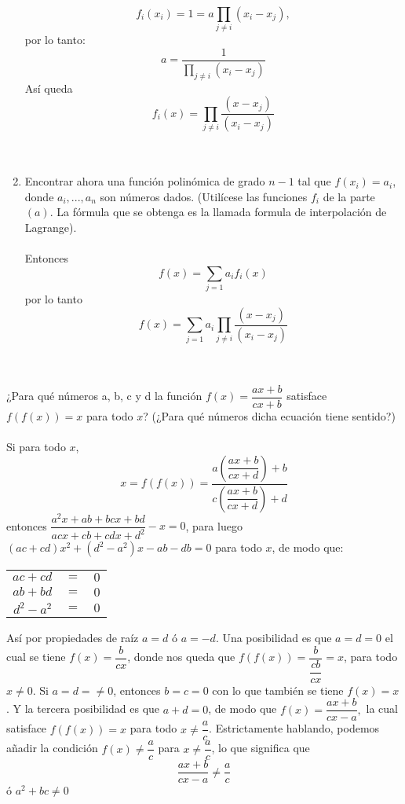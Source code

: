 \begin{ej}
\begin{enumerate}[\bfseries a)]
\[
f_i(x_i)=1=a\prod_{j \neq i} (x_i-x_j), 
\]
por lo tanto:
\[
a= \dfrac{1}{\displaystyle\prod_{j \neq i} (x_i-x_j)} 
\]  
Así queda
\[
f_i(x)= \prod_{j \neq i} \dfrac{(x-x_j)}{(x_i-x_j)}  
\]\\\\
\item Encontrar ahora una función polinómica de grado $n-1$ tal que $f(x_i)=a_i$, donde $a_i,...,a_n$ son números dados. (Utilícese las funciones $f_i$ de la parte $(a)$. La fórmula que se obtenga es la llamada formula de interpolación de Lagrange).\\\\
Entonces \[ f(x) = \sum_{j=1} a_i f_i(x) \]
por lo tanto  \[ f(x) = \sum_{j=1} a_i \prod_{j \neq i} \dfrac{(x-x_j)}{(x_i-x_j)} \]\\\\ 
\end{enumerate}
\end{ej}

¿Para qué números a, b, c y d la función $f(x) = \dfrac{ax+b}{cx+b}$ satisface $f(f(x))=x$ para todo $x$? (¿Para qué números dicha ecuación tiene sentido?)\\\\
Si para todo $x$, $$x = f(f(x)) = \dfrac{a \left( \dfrac{ax+b}{cx+d} \right) +b}{c \left( \dfrac{ax+b}{cx+d} \right)+d}$$
entonces $\dfrac{a^2 x +ab +bcx +bd}{acx +cb +cdx +d^2} - x = 0$, para luego $(ac+cd)x^2 + (d^2 - a^2)x -ab -db = 0$ para todo $x$, de modo que:
\begin{center}
\begin{tabular}{r c l}
$ac+cd$&$=$&$0$\\
$ab+bd$&$=$&$0$\\
$d^2 -a^2$&$=$&$0$\\
\end{tabular}
\end{center}
Así por propiedades de raíz $a=d$ ó $a =-d$. Una posibilidad es que $a=d=0$ el cual se tiene $f(x) = \dfrac{b}{cx}$, donde nos queda que $f(f(x)) = \dfrac{b}{\dfrac{cb}{cx}} = x$, para todo $x\neq 0$. Si $a=d=\neq 0$, entonces $b=c=0$ con lo que también se tiene $f(x)=x$. Y la tercera posibilidad es que $a+d = 0$, de modo que $f(x)= \dfrac{ax+b}{cx-a},$ la cual satisface $f(f(x))=x$ para todo $x\neq \dfrac{a}{c}$. Estrictamente hablando, podemos añadir la condición $f(x)\neq \dfrac{a}{c}$ para $x\neq \dfrac{a}{c}$, lo que significa que $$\dfrac{ax+b}{cx-a} \neq \frac{a}{c}$$ ó $a^2+bc\neq 0$\\\\

